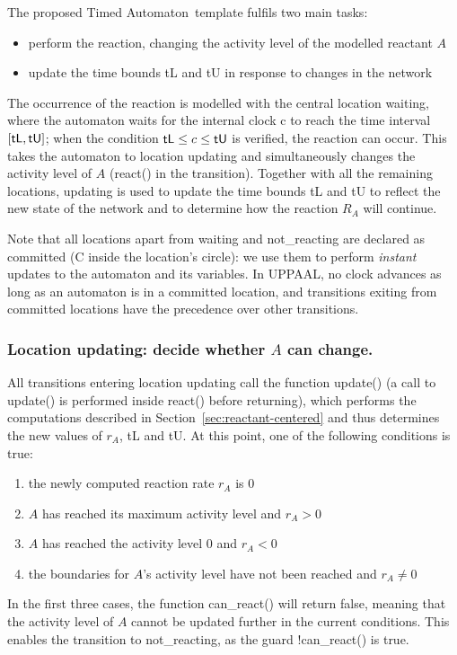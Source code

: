 \documentclass{llncs}
\newcommand{\ta}{Timed Automaton}
\begin{document}
The proposed \ta\ template fulfils two main tasks:
\begin{itemize}
  \item perform the reaction, changing the activity level of the modelled reactant $A$
  \item update the time bounds {\sf tL} and {\sf tU} in response to changes in the network
\end{itemize}
The occurrence of the reaction is modelled with the central location {\sf waiting}, where the automaton
waits for the internal clock {\sf c} to reach the time interval $[{\sf tL}, {\sf tU}]$; when
the condition ${\sf tL} \leq c \leq {\sf tU}$
is verified, the reaction can occur.
This takes the automaton
to location {\sf updating} and simultaneously changes the activity level of $A$ ({\sf react()} in the transition).
Together with all the remaining locations, {\sf updating} is used to update the
time bounds {\sf tL} and {\sf tU} to reflect the new state of the network and to determine
how the reaction $R_A$ will continue.

Note that all locations apart from {\sf waiting} and {\sf not\_reacting} are
declared as committed ({\sf C} inside the location's circle): we use them to perform \emph{instant} updates
to the automaton and its variables. In UPPAAL, no clock advances as long as an automaton is in a committed
location, and transitions exiting from committed locations have the precedence over other transitions.


\subsubsection{Location {\sf updating}: decide whether $A$ can change.}
All transitions entering location {\sf updating} call the function {\sf update()} (a call to {\sf update()}
is performed inside {\sf react()} before returning), which performs the computations described
in Section~\ref{sec:reactant-centered} and thus determines the new values of $r_A$, {\sf tL} and {\sf tU}. At this
point, one of the following conditions is true:
\begin{enumerate}
  \item the newly computed reaction rate $r_A$ is 0
  \item $A$ has reached its maximum activity level and $r_A > 0$
  \item $A$ has reached the activity level 0 and $r_A < 0$
  \item the boundaries for $A$'s activity level have not been reached and $r_A \neq 0$
\end{enumerate}
In the first three cases, the function {\sf can\_react()} will return false, meaning that
the activity level of $A$ cannot be updated further in the current conditions. This enables the transition to
{\sf not\_reacting}, as the guard {\sf !can\_react()} is true.
\end{document}
